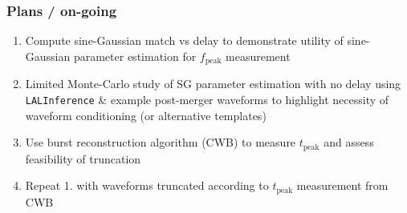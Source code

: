 \documentclass{beamer}
\begin{document}
\begin{frame}
    \frametitle{Plans / on-going}
    \begin{enumerate}
        \item Compute sine-Gaussian match vs delay to demonstrate utility of
            sine-Gaussian parameter estimation for $f_{\text{peak}}$ measurement
        \item Limited Monte-Carlo study of SG parameter estimation with no delay
            using {\tt LALInference} \& example post-merger waveforms to
            highlight necessity of waveform conditioning (or alternative
            templates)
        \item Use burst reconstruction algorithm (CWB) to measure
            $t_{\text{peak}}$ and assess feasibility of truncation
        \item Repeat 1. with waveforms truncated according to $t_{\text{peak}}$
            measurement from CWB
    \end{enumerate}

\end{frame}
\end{document}
